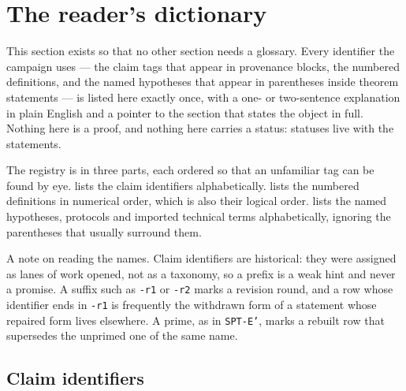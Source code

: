 
\section{The reader's dictionary}
\label{sec:dictionary}

This section exists so that no other section needs a glossary. Every
identifier the campaign uses --- the claim tags that appear in provenance
blocks, the numbered definitions, and the named hypotheses that appear in
parentheses inside theorem statements --- is listed here exactly once, with a
one- or two-sentence explanation in plain English and a pointer to the
section that states the object in full. Nothing here is a proof, and nothing
here carries a status: statuses live with the statements.

The registry is in three parts, each ordered so that an unfamiliar tag can be
found by eye.  lists the claim identifiers
alphabetically.  lists the numbered definitions in
numerical order, which is also their logical order.
 lists the named hypotheses, protocols and imported
technical terms alphabetically, ignoring the parentheses that usually
surround them.

A note on reading the names. Claim identifiers are historical: they were
assigned as lanes of work opened, not as a taxonomy, so a prefix is a weak
hint and never a promise. A suffix such as \texttt{-r1} or \texttt{-r2} marks
a revision round, and a row whose identifier ends in \texttt{-r1} is
frequently the withdrawn form of a statement whose repaired form lives
elsewhere. A prime, as in \texttt{SPT-E'}, marks a rebuilt row that supersedes
the unprimed one of the same name.

\subsection{Claim identifiers}

